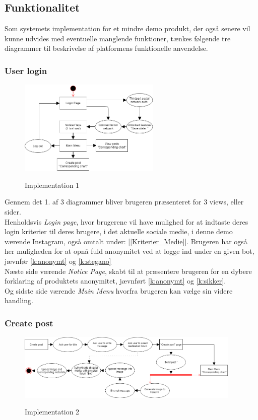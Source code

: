\subsection{Funktionalitet}
\label{funktionalitet}
Som systemets implementation for et mindre demo produkt, der også senere vil kunne udvides med eventuelle manglende funktioner, tænkes følgende tre diagrammer til beskrivelse af platformens funktionelle anvendelse.

\subsubsection{User login}
\begin{figure}[H]
    \centering
    \includegraphics[width=0.60\textwidth]{Projectdoc/Assets/Illustrationer/Implementation-billede1.png}
    \label{fig:implementation1}
    \caption{Implementation 1}
\end{figure}

Gennem det 1. af 3 diagrammer bliver brugeren præsenteret for 3 views, eller sider.\\ 
Henholdsvis \textit{Login page}, hvor brugerene vil have mulighed for at indtaste deres login kriterier til deres brugere, i det aktuelle sociale medie, i denne demo værende Instagram, også omtalt under: [\ref{Kriterier_Medie}]. Brugeren har også her muligheden for at opnå fuld anonymitet ved at logge ind under en given bot, jævnfør \ref{k:anonymt} og \ref{k:stegano} \\
Næste side værende \textit{Notice Page}, skabt til at præsentere brugeren for en dybere forklaring af produktets anonymitet, jævnført \ref{k:anonymt} og \ref{k:sikker}.\\ 
Og sidste side værende \textit{Main Menu} hvorfra brugeren kan vælge sin videre handling.

\subsubsection{Create post}
\begin{figure}[H]
    \centering
    \includegraphics[width=0.95\textwidth]{Projectdoc/Assets/Illustrationer/Implementation-billede2.png}
    \label{fig:implementation2}
    \caption{Implementation 2}
\end{figure}

